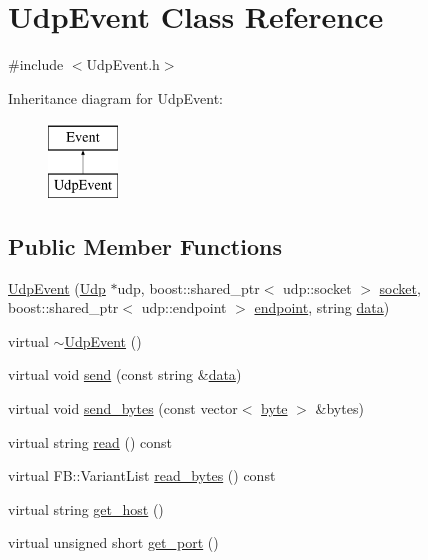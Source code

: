 \hypertarget{classUdpEvent}{
\section{UdpEvent Class Reference}
\label{classUdpEvent}
}


{\ttfamily \#include $<$UdpEvent.h$>$}

Inheritance diagram for UdpEvent:\begin{figure}[H]
\begin{center}
\leavevmode
\includegraphics[height=2.000000cm]{classUdpEvent}
\end{center}
\end{figure}
\subsection*{Public Member Functions}
\begin{DoxyCompactItemize}
\item 
\hyperlink{classUdpEvent_aca86b9eaaa735d1a5111045ce8b4d72d}{UdpEvent} (\hyperlink{classUdp}{Udp} $\ast$udp, boost::shared\_\-ptr$<$ udp::socket $>$ \hyperlink{classUdpEvent_ae0cb6d3007132d3a2481d094d009793a}{socket}, boost::shared\_\-ptr$<$ udp::endpoint $>$ \hyperlink{classUdpEvent_a50389e8d457b8f3cc425d78a5d416288}{endpoint}, string \hyperlink{classUdpEvent_a20b7ebd90eb5b21aa7658e3e77ecc96c}{data})
\item 
virtual \hyperlink{classUdpEvent_aa2b3a2c6bfe7b65715e9d202a27b4784}{$\sim$UdpEvent} ()
\item 
virtual void \hyperlink{classUdpEvent_a1f88c17a020ccf73a61a40d18b3728a0}{send} (const string \&\hyperlink{classUdpEvent_a20b7ebd90eb5b21aa7658e3e77ecc96c}{data})
\item 
virtual void \hyperlink{classUdpEvent_ac44fcd996dd22e49d7dd7721198f7550}{send\_\-bytes} (const vector$<$ \hyperlink{Event_8h_ae0aa21f6bcb621fe36c2c962aa0452fe}{byte} $>$ \&bytes)
\item 
virtual string \hyperlink{classUdpEvent_a860ceb7a3a8bb6fcd7cb1342d8b7f5c7}{read} () const 
\item 
virtual FB::VariantList \hyperlink{classUdpEvent_ad315a9d5969bc5d38f3d592119cac9ca}{read\_\-bytes} () const 
\item 
virtual string \hyperlink{classUdpEvent_ae2484477a11197f79d46e4ef4b71b839}{get\_\-host} ()
\item 
virtual unsigned short \hyperlink{classUdpEvent_aaad6ade41ef171993364911ed57a3185}{get\_\-port} ()
\end{DoxyCompactItemize}
